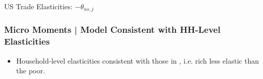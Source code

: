 \documentclass[9pt,pdftex,aspectratio=1610]{beamer}
\theoremstyle{definition}
\begin{document}

\begin{frame}[t]{US Trade Elasticities: $-\theta_{us,j}$}
\begin{figure}[!t]
\end{figure}
\end{frame}

\begin{frame}[t]
\frametitle{Micro Moments | Model Consistent with HH-Level Elasticities}
\begin{figure}[!t]
\end{figure}
\begin{itemize}
\smallskip
\item Household-level elasticities consistent with those in \citet*{auer2022unequal}, i.e. rich less elastic than the poor.
\end{itemize}
\end{frame}
\end{document}
